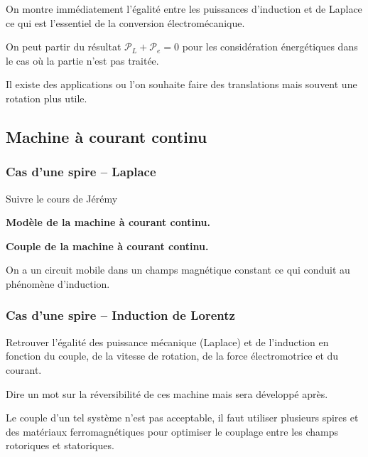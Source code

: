 On montre immédiatement l'égalité entre les puissances d'induction et de Laplace ce qui est l'essentiel de la conversion électromécanique.

\begin{remarque}
On peut partir du résultat ${\mathcal{P}}_L+{\mathcal{P}}_e = 0$ pour les considération énergétiques dans le cas où la partie n'est pas traitée.
\end{remarque}

\begin{transition}
Il existe des applications ou l'on souhaite faire des translations mais souvent une rotation plus utile.
\end{transition}

\subsection{Machine à courant continu}

\subsubsection{Cas d'une spire -- Laplace}

Suivre le cours de Jérémy

\begin{slide}
\textbf{Modèle de la machine à courant continu.}
\end{slide}

\begin{slide}
\textbf{Couple de la machine à courant continu.}
\end{slide}

\begin{transition}
On a un circuit mobile dans un champs magnétique constant ce qui conduit au phénomène d'induction.
\end{transition}

\subsubsection{Cas d'une spire -- Induction de Lorentz}

Retrouver l'égalité des puissance mécanique (Laplace) et de l'induction en fonction du couple, de la vitesse de rotation, de la force électromotrice et du courant.

Dire un mot sur la réversibilité de ces machine mais sera développé après.

\begin{transition}
Le couple d'un tel système n'est pas acceptable, il faut utiliser plusieurs spires et des matériaux ferromagnétiques pour optimiser le couplage entre les champs rotoriques et statoriques.
\end{transition}



